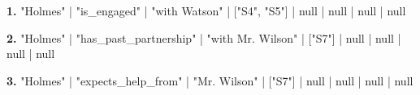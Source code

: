 \noindent\textbf{1.} "Holmes" | "is\_engaged" | "with Watson" | ["S4", "S5"] | null | null | null | null\par\smallskip

\noindent\textbf{2.} "Holmes" | "has\_past\_partnership" | "with Mr. Wilson" | ["S7"] | null | null | null | null\par\smallskip

\noindent\textbf{3.} "Holmes" | "expects\_help\_from" | "Mr. Wilson" | ["S7"] | null | null | null | null\par\smallskip
